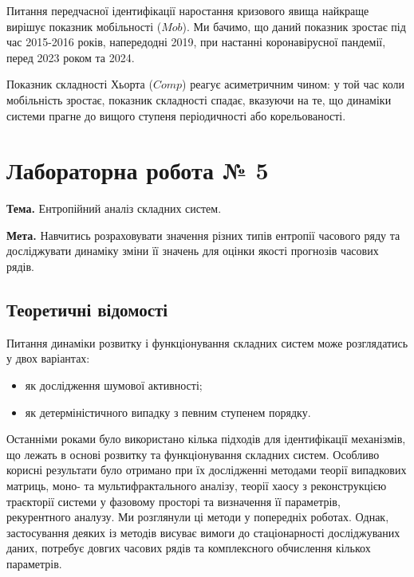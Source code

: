 \documentclass[
  letterpaper,
]{report}
\providecommand{\tightlist}{%
  \setlength{\itemsep}{0pt}\setlength{\parskip}{0pt}}\usepackage{longtable,booktabs,array}
\begin{document}
Питання передчасної ідентифікації наростання кризового явища найкраще
вирішує показник мобільності (\(Mob\)). Ми бачимо, що даний показник
зростає під час 2015-2016 років, напередодні 2019, при настанні
коронавірусної пандемії, перед 2023 роком та 2024.

Показник складності Хьорта (\(Comp\)) реагує асиметричним чином: у той
час коли мобільність зростає, показник складності спадає, вказуючи на
те, що динаміки системи прагне до вищого ступеня періодичності або
корельованості.


\hypertarget{ux43bux430ux431ux43eux440ux430ux442ux43eux440ux43dux430-ux440ux43eux431ux43eux442ux430-5}{%
\chapter{Лабораторна робота №
5}\label{ux43bux430ux431ux43eux440ux430ux442ux43eux440ux43dux430-ux440ux43eux431ux43eux442ux430-5}}

\textbf{Тема.} Ентропійний аналіз складних систем.

\textbf{Мета.} Навчитись розраховувати значення різних типів ентропії
часового ряду та досліджувати динаміку зміни її значень для оцінки
якості прогнозів часових рядів.

\hypertarget{ux442ux435ux43eux440ux435ux442ux438ux447ux43dux456-ux432ux456ux434ux43eux43cux43eux441ux442ux456-4}{%
\section{Теоретичні
відомості}\label{ux442ux435ux43eux440ux435ux442ux438ux447ux43dux456-ux432ux456ux434ux43eux43cux43eux441ux442ux456-4}}

Питання динаміки розвитку і функціонування складних систем може
розглядатись у двох варіантах:

\begin{itemize}
\tightlist
\item
  як дослідження шумової активності;
\item
  як детерміністичного випадку з певним ступенем порядку.
\end{itemize}

Останніми роками було використано кілька підходів для ідентифікації
механізмів, що лежать в основі розвитку та функціонування складних
систем. Особливо корисні результати було отримано при їх дослідженні
методами теорії випадкових матриць, моно- та мультифрактального аналізу,
теорії хаосу з реконструкцією траєкторії системи у фазовому просторі та
визначення її параметрів, рекурентного аналузу. Ми розглянули ці методи
у попередніх роботах. Однак, застосування деяких із методів висуває
вимоги до стаціонарності досліджуваних даних, потребує довгих часових
рядів та комплексного обчислення кількох параметрів.
\end{document}
